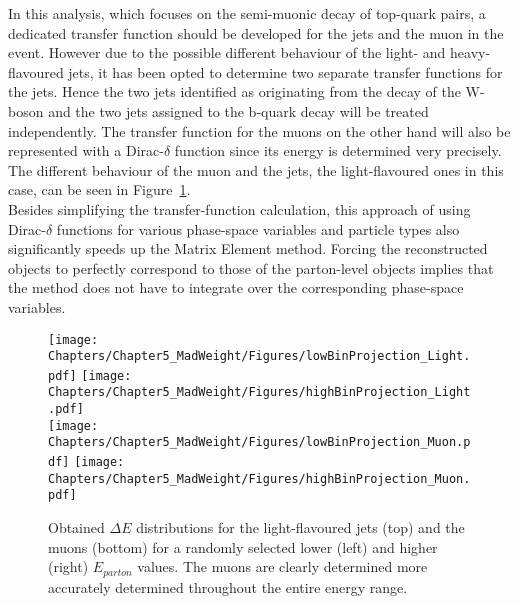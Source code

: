 In this analysis, which focuses on the semi-muonic decay of top-quark pairs, a dedicated transfer function should be developed for the jets and the muon in the event.
However due to the possible different behaviour of the light- and heavy-flavoured jets, it has been opted to determine two separate transfer functions for the jets.
Hence the two jets identified as originating from the decay of the W-boson and the two jets assigned to the b-quark decay will be treated independently. 
The transfer function for the muons on the other hand will also be represented with a Dirac-$\delta$ function since its energy is determined very precisely. The different behaviour of the muon and the jets, the light-flavoured ones in this case, can be seen in Figure~\ref{fig::TFJetEDistr}.
\\
Besides simplifying the transfer-function calculation, this approach of using Dirac-$\delta$ functions for various phase-space variables and particle types also significantly speeds up the Matrix Element method.
Forcing the reconstructed objects to perfectly correspond to those of the parton-level objects implies that the method does not have to integrate over the corresponding phase-space variables.
\\
\begin{figure}[h!tp]
 \centering
 \texttt{[image: Chapters/Chapter5\_MadWeight/Figures/lowBinProjection\_Light.pdf]} \hspace{0.2cm}
 \texttt{[image: Chapters/Chapter5\_MadWeight/Figures/highBinProjection\_Light.pdf]} \\ \vspace{0.2cm}
 \texttt{[image: Chapters/Chapter5\_MadWeight/Figures/lowBinProjection\_Muon.pdf]} \hspace{0.2cm}
 \texttt{[image: Chapters/Chapter5\_MadWeight/Figures/highBinProjection\_Muon.pdf]}
 \caption{Obtained $\Delta E$ distributions for the light-flavoured jets (top) and the muons (bottom) for a randomly selected lower (left) and higher (right) $E_{parton}$ values. The muons are clearly determined more accurately determined throughout the entire energy range.} \label{fig::TFJetEDistr}
\end{figure}

